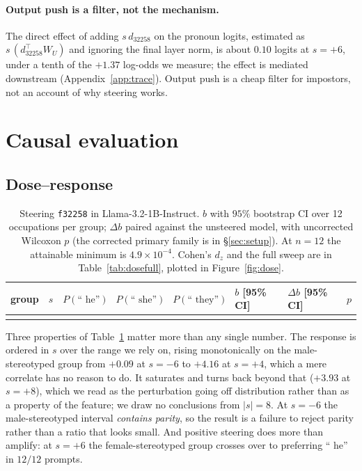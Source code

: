 \documentclass{article}
\newcommand{\phe}{P(\text{`` he''})}
\newcommand{\pshe}{P(\text{`` she''})}
\newcommand{\pthey}{P(\text{`` they''})}
\newcommand{\ff}[1]{\texttt{f#1}}
\begin{document}
\paragraph{Output push is a filter, not the mechanism.}
The direct effect of adding $s\,d_{32258}$ on the pronoun logits, estimated as
$s\,(d_{32258}^\top W_U)$ and ignoring the final layer norm, is about $0.10$ logits at
$s=+6$, under a tenth of the $+1.37$ log-odds we measure; the effect is mediated
downstream (Appendix~\ref{app:trace}). Output push is a cheap filter for impostors, not an
account of why steering works.

\section{Causal evaluation}

\subsection{Dose--response}
\label{sec:dose}

\begin{table}[t]
\centering
\caption{Steering \ff{32258} in Llama-3.2-1B-Instruct. $b$ with $95\%$ bootstrap CI over
12 occupations per group; $\Delta b$ paired against the unsteered model, with uncorrected Wilcoxon
$p$ (the corrected primary family is in \S\ref{sec:setup}). At $n=12$ the attainable minimum is
$4.9\times10^{-4}$. Cohen's $d_z$ and the full sweep are in
Table~\ref{tab:dosefull}, plotted in Figure~\ref{fig:dose}.}
\label{tab:dose}
\footnotesize
\setlength{\tabcolsep}{3pt}
\begin{tabular}{lrrrrllr}
\toprule
group & $s$ & $\phe$ & $\pshe$ & $\pthey$ & $b$ [95\% CI] & $\Delta b$ [95\% CI] & $p$ \\
\midrule
 \\
\bottomrule
\end{tabular}
\end{table}
Three properties of Table~\ref{tab:dose} matter more than any single number. The response
is ordered in $s$ over the range we rely on, rising monotonically on the male-stereotyped
group from $+0.09$ at $s=-6$ to $+4.16$ at $s=+4$, which a mere correlate has no reason to
do. It saturates and turns back beyond that ($+3.93$ at $s=+8$), which we read as the
perturbation going off distribution rather than as a property of the feature; we draw no
conclusions from $|s|=8$. At $s=-6$ the male-stereotyped interval \SteerMaleCI{}
\emph{contains parity}, so the result is a failure to reject parity rather than a ratio that
looks small. And positive steering does more than amplify: at $s=+6$ the female-stereotyped
group crosses over to preferring `` he'' in $12/12$ prompts.
\end{document}
